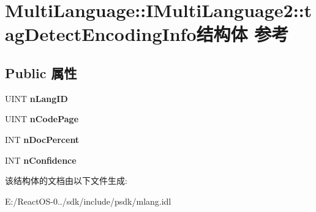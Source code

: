 \hypertarget{struct_multi_language_1_1_i_multi_language2_1_1tag_detect_encoding_info}{}\section{Multi\+Language\+:\+:I\+Multi\+Language2\+:\+:tag\+Detect\+Encoding\+Info结构体 参考}
\label{struct_multi_language_1_1_i_multi_language2_1_1tag_detect_encoding_info}
\subsection*{Public 属性}
\begin{DoxyCompactItemize}
\item 
\mbox{\label{struct_multi_language_1_1_i_multi_language2_1_1tag_detect_encoding_info_a19f99828cc0f9395f3dbf99336f67927}} 
U\+I\+NT {\bfseries n\+Lang\+ID}
\item 
\mbox{\label{struct_multi_language_1_1_i_multi_language2_1_1tag_detect_encoding_info_a489dc7945e7b7a29e97b0cac2ab08563}} 
U\+I\+NT {\bfseries n\+Code\+Page}
\item 
\mbox{\label{struct_multi_language_1_1_i_multi_language2_1_1tag_detect_encoding_info_a161e991fab0ea78229385aadeccbfc4a}} 
I\+NT {\bfseries n\+Doc\+Percent}
\item 
\mbox{\label{struct_multi_language_1_1_i_multi_language2_1_1tag_detect_encoding_info_a165ec5b6c0d8ede4d5241ed8c7b7f032}} 
I\+NT {\bfseries n\+Confidence}
\end{DoxyCompactItemize}


该结构体的文档由以下文件生成\+:\begin{DoxyCompactItemize}
\item 
E\+:/\+React\+O\+S-\/0../sdk/include/psdk/mlang.\+idl\end{DoxyCompactItemize}
